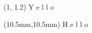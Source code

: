 \documentclass{article}
\begin{document}
\begin{textblock}{2}(1, 1.2)
\noindent
Y e l l o
\end{textblock}

\begin{textblock*}{10mm}(10.5mm,10.5mm)
\noindent
H e l l o
\end{textblock*}


\vspace*{\fill}
\end{document}
